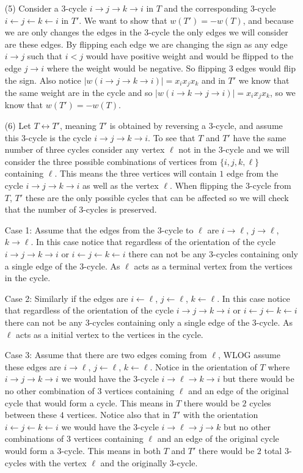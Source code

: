 \documentclass[12pt]{amsart}
\theoremstyle{definition}
\newcommand{\ra}{\rightarrow}
\begin{document}
\begin{itemize}
\item[(5)] %
Consider a $3$-cycle $i\ra j\ra k\ra i$ in $T$ and the corresponding $3$-cycle $i\leftarrow j\leftarrow k\leftarrow i$ in $T'$. We want to show that $w(T')=-w(T)$, and because we are only changes the edges in the $3$-cycle the only edges we will consider are these edges. By flipping each edge we are changing the sign as any edge $i\ra j$ such that $i<j$ would have positive weight and would be flipped to the edge $j\ra i$ where the weight would be negative. So flipping $3$ edges would flip the sign. Also notice $|w(i\ra j\ra k \ra i)|=x_ix_jx_k$ and in $T'$ we know that the same weight are in the cycle and so $|w(i\ra k\ra j \ra i)|=x_ix_jx_k$, so we know that $w(T')=-w(T)$.\\

\item[(6)] Let $T\leftrightarrow T'$, meaning $T'$ is obtained by reversing a $3$-cycle, and assume this $3$-cycle is the cycle $i\ra j \ra k \ra i$. To see that $T$ and $T'$ have the same number of three cycles consider any vertex $\ell$ not in the $3$-cycle and we will consider the three possible combinations of vertices from $\{i,j,k,\ell\}$ containing $\ell$. This means the three vertices will contain $1$ edge from the cycle $i\ra j\ra k\ra i$ as well as the vertex $\ell$. When flipping the $3$-cycle from $T$, $T'$ these are the only possible cycles that can be affected so we will check that the number of $3$-cycles is preserved.

Case 1: Assume that the edges from the $3$-cycle to $\ell$ are $i\ra \ell$, $j\ra \ell$, $k\ra \ell$. In this case notice that regardless of the orientation of the cycle $i\ra j \ra k \ra i$ or $i\leftarrow j \leftarrow k \leftarrow i$ there can not be any $3$-cycles containing only a single edge of the $3$-cycle. As $\ell$ acts as a terminal vertex from the vertices in the cycle.

Case 2: Similarly if the edges are $i\leftarrow \ell$, $j\leftarrow \ell$, $k\leftarrow \ell$. In this case notice that regardless of the orientation of the cycle $i\ra j \ra k \ra i$ or $i\leftarrow j \leftarrow k \leftarrow i$ there can not be any $3$-cycles containing only a single edge of the $3$-cycle. As $\ell$ acts as a initial vertex to the vertices in the cycle.

Case 3: Assume that there are two edges coming from $\ell$, WLOG assume these edges are $i\ra \ell$, $j\leftarrow \ell$, $k\leftarrow \ell$. Notice in the orientation of $T$ where $i\ra j\ra k\ra i$ we would have the $3$-cycle $i\ra \ell\ra k\ra i$ but there would be no other combination of $3$ vertices containing $\ell$ and an edge of the original cycle that would form a cycle. This means in $T$ there would be $2$ cycles between these $4$ vertices. Notice also that in $T'$ with the orientation $i\leftarrow j \leftarrow k \leftarrow i$ we would have the $3$-cycle $i\ra \ell \ra j \ra k$ but no other combinations of $3$ vertices containing $\ell$ and an edge of the original cycle would form a $3$-cycle. This means in both $T$ and $T'$ there would be $2$ total $3$-cycles with the vertex $\ell$ and the originally $3$-cycle.


\end{itemize}
\end{document}
